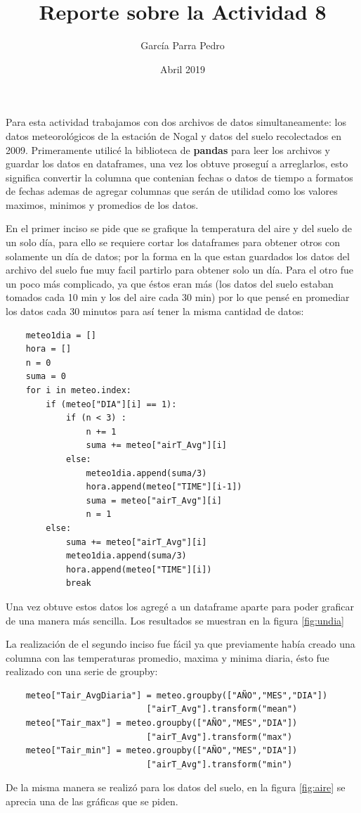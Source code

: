\documentclass[12pt]{article}
\title{Reporte sobre la Actividad 8}
\author{García Parra Pedro}
\date{Abril 2019}
\begin{document}
\maketitle
Para esta actividad trabajamos con dos archivos de datos simultaneamente: los datos meteorológicos de la estación de Nogal y datos del suelo recolectados en 2009. Primeramente utilic\'e la biblioteca de \textbf{pandas} para leer los archivos y guardar los datos en dataframes, una vez los obtuve prosegu\'i a arreglarlos, esto significa convertir la columna que contenian fechas o datos de tiempo a formatos de fechas ademas de agregar columnas que ser\'an de utilidad como los valores maximos, minimos y promedios de los datos.

En el primer inciso se pide que se grafique la temperatura del aire y del suelo de un solo d\'ia, para ello se requiere cortar los dataframes para obtener otros con solamente un d\'ia de datos; por la forma en la que estan guardados los datos del archivo del suelo fue muy facil partirlo para obtener solo un d\'ia. Para el otro fue un poco m\'as complicado, ya que \'estos eran m\'as (los datos del suelo estaban tomados cada 10 min y los del aire cada 30 min) por lo que pens\'e en promediar los datos cada 30 minutos para as\'i tener la misma cantidad de datos:
\begin{verbatim}
    meteo1dia = []
    hora = []
    n = 0
    suma = 0
    for i in meteo.index:
        if (meteo["DIA"][i] == 1):
            if (n < 3) :
                n += 1
                suma += meteo["airT_Avg"][i]
            else:
                meteo1dia.append(suma/3)
                hora.append(meteo["TIME"][i-1])
                suma = meteo["airT_Avg"][i]
                n = 1
        else:
            suma += meteo["airT_Avg"][i]
            meteo1dia.append(suma/3)
            hora.append(meteo["TIME"][i])
            break
\end{verbatim}
Una vez obtuve estos datos los agreg\'e a un dataframe aparte para poder graficar de una manera m\'as sencilla. Los resultados se muestran en la figura \ref{fig:undia}



La realizaci\'on de el segundo inciso fue f\'acil ya que previamente hab\'ia creado una columna con las temperaturas promedio, maxima y minima diaria, \'esto fue realizado con una serie de groupby:
\begin{verbatim}
    meteo["Tair_AvgDiaria"] = meteo.groupby(["AÑO","MES","DIA"])
                            ["airT_Avg"].transform("mean") 
    meteo["Tair_max"] = meteo.groupby(["AÑO","MES","DIA"])
                            ["airT_Avg"].transform("max")
    meteo["Tair_min"] = meteo.groupby(["AÑO","MES","DIA"])
                            ["airT_Avg"].transform("min") 
\end{verbatim}
De la misma manera se realiz\'o para los datos del suelo, en la figura \ref{fig:aire} se aprecia una de las gr\'aficas que se piden.
\end{document}
